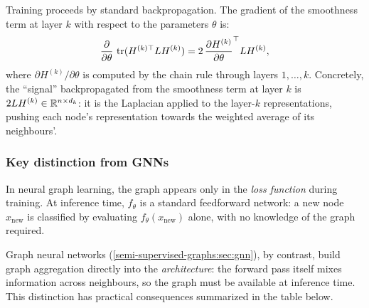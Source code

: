 \begin{notechapter}
Training proceeds by standard backpropagation. The gradient of the smoothness
term at layer $k$ with respect to the parameters $\theta$ is:
\[
\frac{\partial}{\partial \theta}\,\operatorname{tr}(H^{(k)\top} L H^{(k)})
= 2\,\frac{\partial H^{(k)}}{\partial \theta}^\top L H^{(k)},
\]
where $\partial H^{(k)}/\partial \theta$ is computed by the chain rule through
layers $1, \ldots, k$. Concretely, the ``signal'' backpropagated from the
smoothness term at layer $k$ is $2L H^{(k)} \in \mathbb{R}^{n \times d_k}$: it is the
Laplacian applied to the layer-$k$ representations, pushing each node's
representation towards the weighted average of its neighbours'.

\subsubsection*{Key distinction from GNNs}

\begin{pitfall}
In neural graph learning, the graph appears only in the \emph{loss function}
during training. At inference time, $f_\theta$ is a standard feedforward
network: a new node $x_{\text{new}}$ is classified by evaluating
$f_\theta(x_{\text{new}})$ alone, with no knowledge of the graph required.

Graph neural networks (\cref{semi-supervised-graphs:sec:gnn}), by contrast, build graph
aggregation directly into the \emph{architecture}: the forward pass itself
mixes information across neighbours, so the graph must be available at inference
time. This distinction has practical consequences summarized in the table below.
\end{pitfall}

\begin{center}
\small
{}
\end{center}


\end{notechapter}
